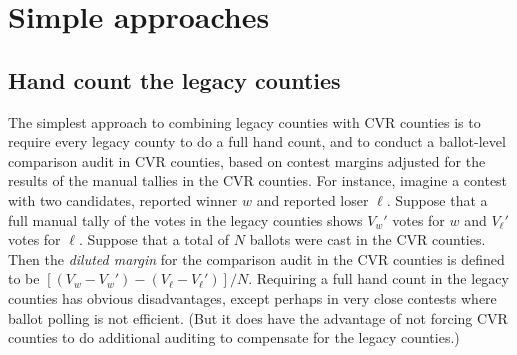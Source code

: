 \documentclass[runningheads]{llncs}
\begin{document}
\section{Simple approaches} \label{sec:crude}

\subsection{Hand count the legacy counties}
The simplest approach to combining legacy counties with CVR counties is to require every
legacy county to do a full hand count, and to conduct a 
ballot-level comparison audit in CVR counties, based on contest margins adjusted for
the results of the manual tallies in the CVR counties.
For instance, imagine a contest with two candidates, reported winner $w$ and reported loser $\ell$.
Suppose that a full manual tally of the votes in the legacy counties shows $V_w'$ votes for $w$ and
$V_\ell'$ votes for $\ell$.
Suppose that a total of $N$ ballots were cast in the CVR counties.
Then the \emph{diluted margin}  for the comparison audit in the CVR counties is defined to be
$[(V_w-V_w')-(V_\ell-V_\ell')]/N$.
Requiring a full hand count in the legacy counties has obvious disadvantages, except perhaps in very 
close contests where ballot polling is not efficient. 
(But it does have the advantage of not forcing CVR 
counties to do additional auditing to compensate for the legacy counties.)
\end{document}
